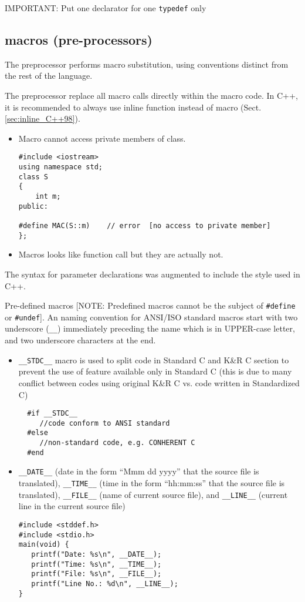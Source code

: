 IMPORTANT: Put one declarator for one \verb!typedef! only

\subsection{macros (pre-processors)}
\label{sec:macro_C}

The preprocessor performs macro substitution, using conventions distinct from
the rest of the language.

The preprocessor replace all macro calls directly within the macro code. In C++,
it is recommended to always use inline function instead of macro
(Sect.\ref{sec:inline_C++98}).
\begin{itemize}
  \item  Macro cannot access private members of class. 

\begin{lstlisting}
#include <iostream> 
using namespace std; 
class S 
{ 
    int m; 
public: 

#define MAC(S::m)    // error  [no access to private member]
};
\end{lstlisting}

  \item Macros looks like function call but they are actually not.

\end{itemize}

The syntax for parameter declarations was augmented to include the style used in
C++.

Pre-defined macros [NOTE: Predefined macros cannot be the subject of
\verb!#define! or \verb!#undef!]. An naming convention for ANSI/ISO standard
macros start with two underscore (\verb!__!) immediately preceding the name
which is in UPPER-case letter, and two underscore characters at the end.
\begin{itemize}
  \item \verb!__STDC__! macro is used to split code in Standard C and K\&R C
  section to prevent the use of feature available only in Standard C (this is
  due to many conflict between codes using original K\&R C vs. code written in
  Standardized C)
  \begin{verbatim}
  #if __STDC__
     //code conform to ANSI standard
  #else
  	 //non-standard code, e.g. CONHERENT C
  #end
  \end{verbatim}
  
  \item \verb!__DATE__! (date in the form ``Mmm dd yyyy'' that the source file
  is translated), \verb!__TIME__! (time in the form ``hh:mm:ss'' that the source
  file is translated), \verb!__FILE__! (name of current source file), and
  \verb!__LINE__! (current line in the current source file)
  \begin{verbatim}
#include <stddef.h>
#include <stdio.h>
main(void) {
   printf("Date: %s\n", __DATE__);
   printf("Time: %s\n", __TIME__);
   printf("File: %s\n", __FILE__);
   printf("Line No.: %d\n", __LINE__);
}
  \end{verbatim}
\end{itemize}

